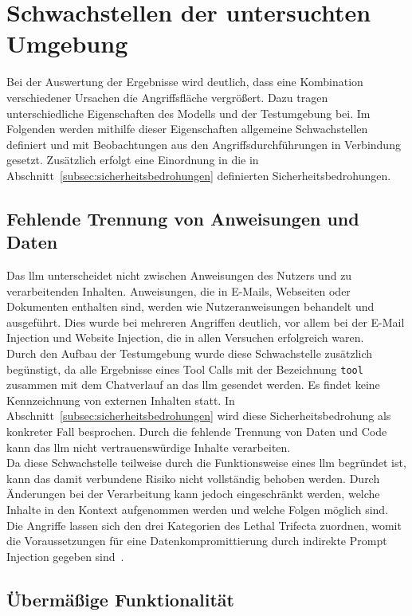 \section{Schwachstellen der untersuchten Umgebung}\label{sec:schwachstellen_umgebung}

Bei der Auswertung der Ergebnisse wird deutlich, dass eine Kombination verschiedener Ursachen die Angriffsfläche vergrößert. Dazu tragen unterschiedliche
Eigenschaften des Modells und der Testumgebung bei. Im Folgenden werden mithilfe dieser Eigenschaften allgemeine Schwachstellen definiert und mit Beobachtungen aus den
Angriffsdurchführungen in Verbindung gesetzt. Zusätzlich erfolgt eine Einordnung in die in Abschnitt~\ref{subsec:sicherheitsbedrohungen} definierten 
Sicherheitsbedrohungen.

\subsection{Fehlende Trennung von Anweisungen und Daten}

Das \ac{llm} unterscheidet nicht zwischen Anweisungen des Nutzers und zu verarbeitenden Inhalten. Anweisungen, die in E-Mails, Webseiten oder Dokumenten enthalten sind,
werden wie Nutzeranweisungen behandelt und ausgeführt. Dies wurde bei mehreren Angriffen deutlich, vor allem bei der E-Mail Injection und Website Injection, die in 
allen Versuchen erfolgreich waren. \\
Durch den Aufbau der Testumgebung wurde diese Schwachstelle zusätzlich begünstigt, da alle Ergebnisse eines Tool Calls mit der Bezeichnung \texttt{tool} zusammen mit 
dem Chatverlauf an das \ac{llm} gesendet werden. Es findet keine Kennzeichnung von externen Inhalten statt. 
In Abschnitt~\ref{subsec:sicherheitsbedrohungen} wird diese Sicherheitsbedrohung als konkreter Fall besprochen. Durch die fehlende Trennung von Daten und Code kann
das \ac{llm} nicht vertrauenswürdige Inhalte verarbeiten. \\
Da diese Schwachstelle teilweise durch die Funktionsweise eines \ac{llm} begründet ist, kann das damit verbundene Risiko nicht vollständig behoben werden. Durch
Änderungen bei der Verarbeitung kann jedoch eingeschränkt werden, welche Inhalte in den Kontext aufgenommen werden und welche Folgen möglich sind.
Die Angriffe lassen sich den drei Kategorien des Lethal Trifecta zuordnen, womit die Voraussetzungen für eine Datenkompromittierung durch indirekte Prompt Injection
gegeben sind~\cite[13]{pi24}.

\subsection{Übermäßige Funktionalität}

